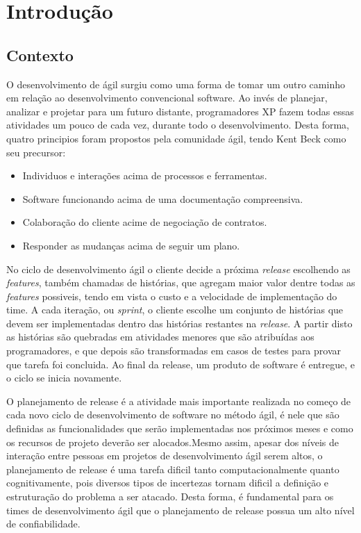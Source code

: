 \chapter{Introdução}
\section{Contexto}
O desenvolvimento de ágil surgiu como uma forma de tomar um outro
caminho em relação ao desenvolvimento convencional software. Ao invés de planejar,
analizar e projetar para um futuro distante, programadores XP fazem todas essas
atividades um pouco de cada vez, durante todo o desenvolvimento\cite{XP}.
Desta forma, quatro principios foram propostos pela comunidade ágil, tendo Kent
Beck como seu precursor\cite{beckManifesto}:
\begin{itemize}
    \item Individuos e interações acima de processos e ferramentas.
    \item Software funcionando acima de uma documentação compreensiva.
    \item Colaboração do cliente acime de negociação de contratos.
    \item Responder as mudanças acima de seguir um plano.
\end{itemize}

No ciclo de desenvolvimento ágil o cliente decide a próxima \textit{release}
escolhendo as \textit{features}, também chamadas de histórias, que agregam
maior valor dentre todas as \textit{features} possiveis, tendo em vista  o custo
e a velocidade de implementação do time. A cada iteração, ou \textit{sprint}, o
cliente escolhe um conjunto de  histórias que devem ser implementadas dentro das
histórias restantes na \textit{release}. A partir disto as histórias são quebradas em
atividades menores que são atribuídas aos programadores, e que depois são
transformadas em casos de testes para provar que tarefa foi concluida\cite{XP}.
Ao final da release, um produto de software é entregue, e o ciclo se inicia
novamente.

O planejamento de release é a atividade mais importante realizada no começo de
cada novo ciclo de desenvolvimento de software no método ágil, é nele que são
definidas as funcionalidades que serão implementadas nos próximos meses e como
os recursos de projeto deverão ser alocados.Mesmo assim, apesar dos níveis de
interação entre pessoas em projetos de desenvolvimento ágil serem altos,
o planejamento de  release é uma tarefa dificil tanto computacionalmente quanto
cognitivamente, pois diversos tipos de incertezas tornam dificil a definição e
estruturação do problema a ser atacado\cite{Ngo}. Desta forma, é fundamental para
os times de desenvolvimento ágil que o planejamento de release possua um alto
nível de confiabilidade\cite{McDaid}.

